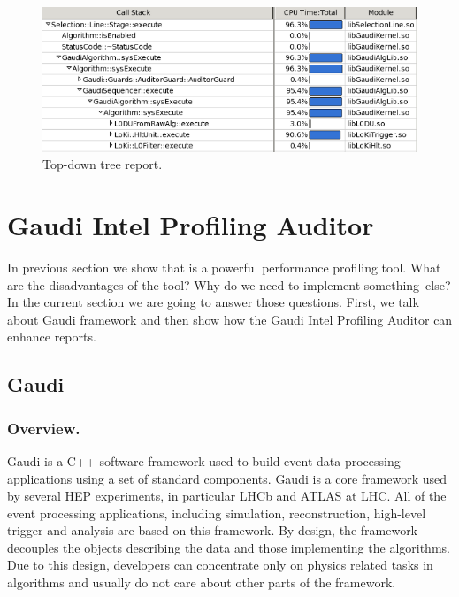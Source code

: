 \documentclass[a4paper]{jpconf}
\begin{document}
\begin{figure}[H]
\begin{minipage}{\textwidth}
\includegraphics[width=\textwidth]{figs/fig06.png}
\caption{\label{fig06}Top-down tree report.}
\end{minipage}
\end{figure}

\section{Gaudi Intel Profiling Auditor}

In previous section we show that \iamp is a powerful performance profiling tool. What are the disadvantages of the tool? Why do we need to implement something~else? In the current section we are going to answer those questions. First, we talk about Gaudi framework and then show how the Gaudi Intel Profiling Auditor can enhance \amp reports.

\subsection{Gaudi}

\subsubsection{Overview.}

Gaudi is a C++ software framework used to build event data processing applications using a set of standard components.  Gaudi is a core framework used by several HEP experiments, in particular LHCb and ATLAS at LHC. All of the event processing applications, including simulation, reconstruction, high-level trigger and analysis are based on this framework. By design, the framework decouples the objects  describing the data and those implementing the algorithms. Due to this design,  developers can concentrate only on  physics related tasks in algorithms and usually do not care about other parts of the framework. 
\end{document}
